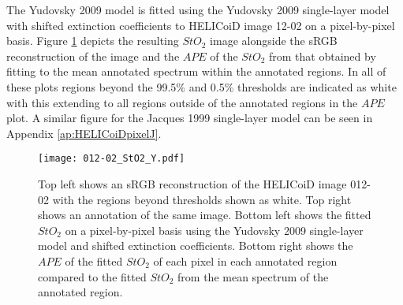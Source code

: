 %

The Yudovsky 2009 model is fitted using the Yudovsky 2009 single-layer model with shifted extinction coefficients to HELICoiD image 12-02 on a pixel-by-pixel basis. Figure \ref{fig:HELICoiDpixelY} depicts the resulting $StO_2$ image alongside the sRGB reconstruction of the image and the $APE$ of the $StO_2$ from that obtained by fitting to the mean annotated spectrum within the annotated regions. In all of these plots regions beyond the 99.5\% and 0.5\% thresholds are indicated as white with this extending to all regions outside of the annotated regions in the $APE$ plot. A similar figure for the Jacques 1999 single-layer model can be seen in Appendix \ref{ap:HELICoiDpixelJ}.

\begin{figure}[h!]
    \centering 
    \texttt{[image: 012-02\_StO2\_Y.pdf]}
    \caption{Top left shows an sRGB reconstruction of the HELICoiD image 012-02 with the regions beyond thresholds shown as white. Top right shows an annotation of the same image. Bottom left shows the fitted $StO_2$ on a pixel-by-pixel basis using the Yudovsky 2009 single-layer model and shifted extinction coefficients. Bottom right shows the $APE$ of the fitted $StO_2$ of each pixel in each annotated region compared to the fitted $StO_2$ from the mean spectrum of the annotated region.}
    \label{fig:HELICoiDpixelY}
\end{figure}

